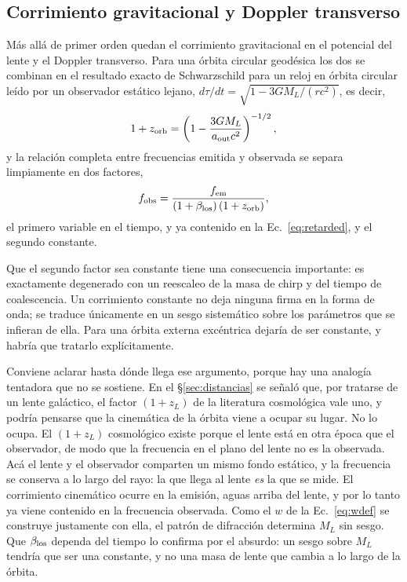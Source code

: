 \documentclass[11pt,a4paper,openany]{book}
\newcommand{\aout}{a_{\mathrm{out}}}
\begin{document}
\subsection*{Corrimiento gravitacional y Doppler transverso}

M\'as all\'a de primer orden quedan el corrimiento gravitacional en el
potencial del lente y el Doppler transverso. Para una \'orbita circular
geod\'esica los dos se combinan en el resultado exacto de Schwarzschild para un
reloj en \'orbita circular le\'ido por un observador est\'atico lejano,
$d\tau/dt=\sqrt{1-3GM_L/(rc^{2})}$, es decir,
\begin{equation}
  1+z_{\rm orb}=\left(1-\frac{3GM_L}{\aout c^{2}}\right)^{-1/2} ,
  \label{eq:zorb}
\end{equation}
y la relaci\'on completa entre frecuencias emitida y observada se separa
limpiamente en dos factores,
\begin{equation}
  f_{\rm obs}=\frac{f_{\rm em}}{\left(1+\beta_{\rm los}\right)\left(1+z_{\rm orb}\right)} ,
  \label{eq:freq_full}
\end{equation}
el primero variable en el tiempo, y ya contenido en la
Ec.~\eqref{eq:retarded}, y el segundo constante.

Que el segundo factor sea constante tiene una consecuencia importante: es
exactamente degenerado con un reescaleo de la masa de chirp y del tiempo de
coalescencia. Un corrimiento constante no deja ninguna firma en la forma de
onda; se traduce \'unicamente en un sesgo sistem\'atico sobre los par\'ametros
que se infieran de ella. Para una \'orbita externa exc\'entrica dejar\'ia de
ser constante, y habr\'ia que tratarlo expl\'icitamente.

Conviene aclarar hasta d\'onde llega ese argumento, porque hay una analog\'ia
tentadora que no se sostiene. En el \S\ref{sec:distancias} se se\~nal\'o que,
por tratarse de un lente gal\'actico, el factor $(1+z_L)$ de la literatura
cosmol\'ogica vale uno, y podr\'ia pensarse que la cinem\'atica de la \'orbita
viene a ocupar su lugar. No lo ocupa. El $(1+z_L)$ cosmol\'ogico existe porque
el lente est\'a en otra \'epoca que el observador, de modo que la frecuencia en
el plano del lente no es la observada. Ac\'a el lente y el observador comparten
un mismo fondo est\'atico, y la frecuencia se conserva a lo largo del rayo: la
que llega al lente \emph{es} la que se mide. El corrimiento cinem\'atico ocurre
en la emisi\'on, aguas arriba del lente, y por lo tanto ya viene contenido en la
frecuencia observada. Como el $w$ de la Ec.~\eqref{eq:wdef} se construye
justamente con ella, el patr\'on de difracci\'on determina $M_L$ sin sesgo. Que
$\beta_{\rm los}$ dependa del tiempo lo confirma por el absurdo: un sesgo sobre
$M_L$ tendr\'ia que ser una constante, y no una masa de lente que cambia a lo
largo de la \'orbita.
\end{document}

